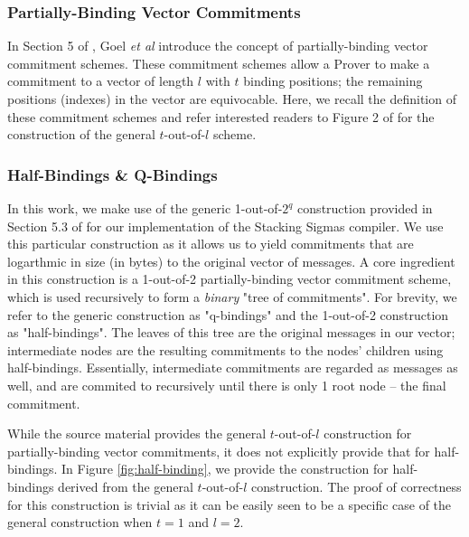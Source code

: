 \subsubsection{Partially-Binding Vector Commitments}
In Section 5 of \cite{StackingSigmas}, Goel {\em{et al}} introduce the concept of partially-binding vector commitment schemes. 
These commitment schemes allow a Prover to make a commitment to a vector of length $l$ with $t$ binding positions; 
the remaining positions (indexes) in the vector are equivocable. 
Here, we recall the definition of these commitment schemes and refer interested readers to Figure 2 of \cite{StackingSigmas} for the construction of the general $t$-out-of-$l$ 
scheme. 

\subsubsection{Half-Bindings \& Q-Bindings}
In this work, we make use of the generic 1-out-of-$2^q$ construction provided in Section 5.3 of \cite{StackingSigmas} for our implementation of the Stacking Sigmas compiler. We use this 
particular construction as it allows us to yield commitments that are logarthmic in size (in bytes) to the original vector of messages. 
A core ingredient in this construction is a 1-out-of-2 partially-binding vector commitment scheme, which is used recursively to form a \textit{binary} "tree of commitments". 
For brevity, we refer to the generic construction as "q-bindings" and the 1-out-of-2 construction as "half-bindings".
The leaves of this tree are the original messages in our vector; intermediate nodes are the resulting commitments to the nodes' children using half-bindings. 
Essentially, intermediate commitments are regarded as messages as well, and are commited to recursively until there is only 1 root node -- the final commitment. 

While the source material provides the general $t$-out-of-$l$ construction for partially-binding vector commitments, it does not explicitly provide that for half-bindings. 
In Figure \ref{fig:half-binding}, we provide the construction for half-bindings derived from the general $t$-out-of-$l$ construction. 
The proof of correctness for this construction is trivial as it can be easily seen to be a specific case of the general construction when $t = 1$ and $l = 2$. 

